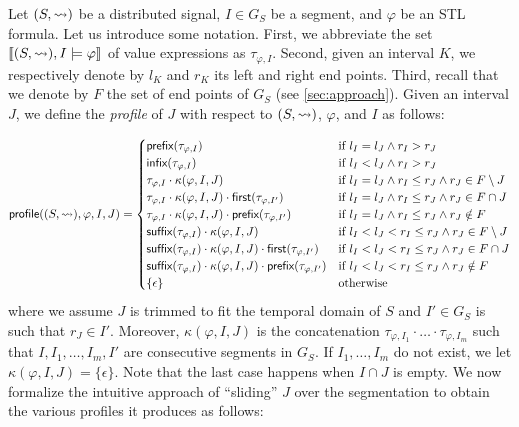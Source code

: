 Let $(S,{\rightsquigarrow})$ be a distributed signal, $I \in G_S$ be a segment, and $\varphi$ be an STL formula.
Let us introduce some notation.
First, we abbreviate the set $\llbracket (S,{\rightsquigarrow}), I \models \varphi \rrbracket$ of value expressions as $\tau_{\varphi,I}$.
Second, given an interval $K$, we respectively denote by $l_K$ and $r_K$ its left and right end points.
Third, recall that we denote by $F$ the set of end points of $G_S$ (see \cref{sec:approach}).
Given an interval $J$, we define the \emph{profile} of $J$ with respect to $(S,{\rightsquigarrow})$, $\varphi$, and 
$I$ as follows:

\vspace{-1em}
\scriptsize
\begin{equation*}
	\mathsf{profile}((S,{\rightsquigarrow}), \varphi, I, J) =
	\begin{cases}
		\textsf{prefix}(\tau_{\varphi,I}) & \text{if } l_I = l_J \land r_I > r_J \\
		\textsf{infix}(\tau_{\varphi,I}) & \text{if } l_I < l_J \land r_I > r_J \\
		\tau_{\varphi,I} \cdot \kappa(\varphi, I, J) & \text{if } l_I = l_J \land r_I \leq r_J \land r_J \in F \setminus J \\
		\tau_{\varphi,I} \cdot \kappa(\varphi, I, J) \cdot \textsf{first}(\tau_{\varphi,I'}) & \text{if } l_I = l_J \land r_I \leq r_J \land r_J \in F \cap J  \\		
		\tau_{\varphi,I} \cdot \kappa(\varphi, I, J) \cdot \textsf{prefix}(\tau_{\varphi,I'}) & \text{if } l_I = l_J \land r_I \leq r_J \land r_J \notin F  \\
		\textsf{suffix}(\tau_{\varphi,I}) \cdot \kappa(\varphi, I, J) & \text{if }  l_I < l_J < r_I \leq r_J \land r_J \in F \setminus J  \\
		\textsf{suffix}(\tau_{\varphi,I}) \cdot \kappa(\varphi, I, J) \cdot \textsf{first}(\tau_{\varphi,I'}) & \text{if } l_I < l_J < r_I \leq r_J \land r_J \in F \cap J \\
		\textsf{suffix}(\tau_{\varphi,I}) \cdot \kappa(\varphi, I, J) \cdot \textsf{prefix}(\tau_{\varphi,I'}) & \text{if } l_I < l_J < r_I \leq r_J \land r_J \notin F \\
		\{\epsilon\} & \text{otherwise}
	\end{cases}
\end{equation*}
\normalsize
where we assume $J$ is trimmed to fit the temporal domain of $S$ and $I' \in G_S$ is such that $r_J \in I'$.
Moreover, $\kappa(\varphi, I, J)$ is the concatenation $\tau_{\varphi,I_1} \cdot \ldots \cdot \tau_{\varphi,I_m}$ such that $I, I_1, \ldots, I_m, I'$ are consecutive segments in $G_S$.
If $I_1, \ldots, I_m$ do not exist, we let $\kappa(\varphi, I, J) = \{\epsilon\}$.
Note that the last case happens when $I \cap J$ is empty.
We now formalize the intuitive approach of ``sliding'' $J$ over the segmentation to obtain the 
various profiles it produces as follows:


